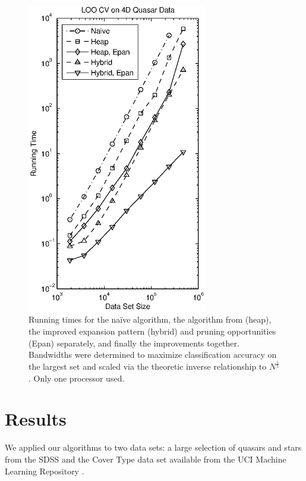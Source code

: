 \documentclass[twoside,leqno,twocolumn]{article}
\begin{document}
\vspace*{0pt}
\newpage

\begin{figure}[tb]
  \vspace{-10pt}
  \begin{center}
    \includegraphics[width=3.1in]{quasar_times_narrow.eps}
  \end{center}
  \vspace{-30pt}
  \caption{\label{fig:quasar-speed}\footnotesize Running times for the
    na\"{i}ve algorithm, the algorithm from \cite{nbc-compstat}
    (heap), the improved expansion pattern (hybrid) and pruning
    opportunities (Epan) separately, and finally the improvements
    together.  Bandwidths were determined to maximize classification
    accuracy on the largest set and scaled via the theoretic inverse
    relationship to $N^{\frac{1}{5}}$.  Only one processor used.}
\end{figure}

\section{Results}\label{sec:res}
We applied our algorithms to two data sets: a large selection of
quasars and stars from the SDSS and the Cover Type data set available
from the UCI Machine Learning Repository \cite{uci-rep}.
\end{document}
